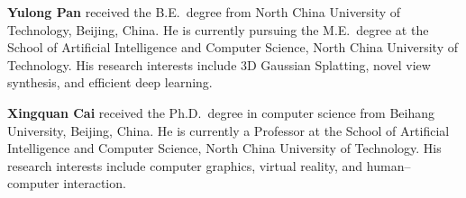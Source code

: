 \documentclass[pdflatex,sn-mathphys]{sn-jnl}
\begin{document}
\textbf{Yulong Pan} %
received the B.E.~degree from North China University of Technology, Beijing, China. He is currently pursuing the M.E.~degree at the School of Artificial Intelligence and Computer Science, North China University of Technology. His research interests include 3D Gaussian Splatting, novel view synthesis, and efficient deep learning.


\textbf{Xingquan Cai} %
received the Ph.D.~degree in computer science from Beihang University, Beijing, China. He is currently a Professor at the School of Artificial Intelligence and Computer Science, North China University of Technology. His research interests include computer graphics, virtual reality, and human--computer interaction.


\end{document}
